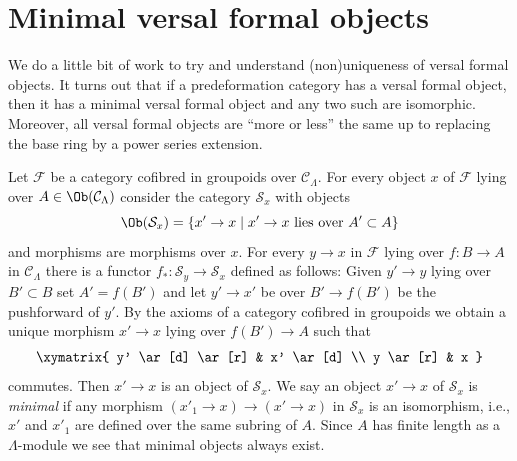\section{Minimal versal formal objects}
\label{section-minimal-versal}

\noindent
We do a little bit of work to try and understand (non)uniqueness
of versal formal objects. It turns out that if a predeformation category
has a versal formal object, then it has a minimal versal formal
object and any two such are isomorphic. Moreover, all versal formal
objects are ``more or less'' the same up to replacing the base ring
by a power series extension.

\medskip\noindent
Let $\mathcal{F}$ be a category cofibred in groupoids over
$\mathcal{C}_\Lambda$. For every object $x$ of $\mathcal{F}$
lying over $A \in \Ob(\mathcal{C}_\Lambda)$ consider the
category $\mathcal{S}_x$ with objects
$$
\Ob(\mathcal{S}_x) =
\{x' \to x \mid x' \to x\text{ lies over }A' \subset A\}
$$
and morphisms are morphisms over $x$. For every $y \to x$ in
$\mathcal{F}$ lying over $f : B \to A$
in $\mathcal{C}_\Lambda$ there is a functor
$f_* : \mathcal{S}_y \to \mathcal{S}_x$ defined as follows:
Given $y' \to y$ lying over $B' \subset B$ set $A' = f(B')$
and let $y' \to x'$ be over $B' \to f(B')$ be the pushforward of $y'$.
By the axioms of a category cofibred in groupoids we obtain a
unique morphism $x' \to x$ lying over $f(B') \to A$ such that
$$
\xymatrix{
y' \ar[d] \ar[r] & x' \ar[d] \\
y \ar[r] & x
}
$$
commutes. Then $x' \to x$ is an object of $\mathcal{S}_x$. We say an
object $x' \to x$ of $\mathcal{S}_x$ is {\it minimal} if any morphism
$(x'_1 \to x) \to (x' \to x)$ in $\mathcal{S}_x$ is an isomorphism, i.e.,
$x'$ and $x'_1$ are defined over the same subring of $A$. Since
$A$ has finite length as a $\Lambda$-module we see that minimal objects
always exist.

